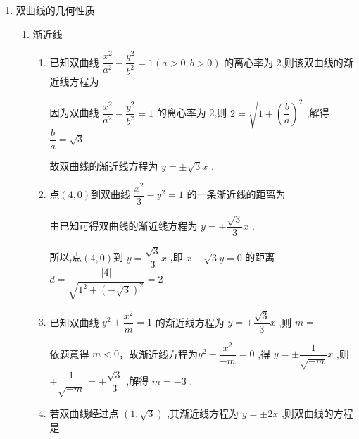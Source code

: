 \begin{enumerate}
\begin{enumerate}
\begin{jieda}
            由双曲线 $\dfrac{{x}^{2}}{{a}^{2}} - \dfrac{{y}^{2}}{{b}^{2}} = 1\left( {a > 0,b > 0}\right)$ 的离心率为 2,得 $e = \dfrac{c}{a} = 2$ ,又 ${c}^{2} = {a}^{2} + {b}^{2}$ ,
            
            解得 $a = 2,c = 4$ ,
            
            则双曲线的方程为 $\dfrac{{x}^{2}}{4} - \dfrac{{y}^{2}}{12} = 1$ .
        \end{jieda}
    \end{enumerate}
    \item 双曲线的几何性质
    \begin{enumerate}
        \item 渐近线
        \begin{enumerate}
            \item 已知双曲线 $\dfrac{{x}^{2}}{{a}^{2}} - \dfrac{{y}^{2}}{{b}^{2}} = 1\left( {a > 0,b > 0}\right)$ 的离心率为 2,则该双曲线的渐近线方程为
            \begin{jieda}
                因为双曲线 $\dfrac{{x}^{2}}{{a}^{2}} - \dfrac{{y}^{2}}{{b}^{2}} = 1$ 的离心率为 2,则 $2 = \sqrt{1 + {\left( \dfrac{b}{a}\right) }^{2}}$ ,解得 $\dfrac{b}{a} = \sqrt{3}$ 
                
                故双曲线的渐近线方程为 $y =  \pm  \sqrt{3}x$ .
            \end{jieda}
            \item 点$(4,0)$到双曲线 $\dfrac{{x}^{2}}{3} - {y}^{2} = 1$ 的一条渐近线的距离为
            \begin{jieda}
                由已知可得双曲线的渐近线方程为 $y =  \pm \dfrac{\sqrt{3}}{3}x$ .
                
                所以,点$(4,0)$到 $y = \dfrac{\sqrt{3}}{3}x$ ,即 $x - \sqrt{3}y = 0$ 的距离 $d = \dfrac{\left| 4\right| }{\sqrt{{1}^{2} + {\left( -\sqrt{3}\right) }^{2}}} = 2$ 
            \end{jieda}
            \item 已知双曲线 ${y}^{2} + \dfrac{{x}^{2}}{m} = 1$ 的渐近线方程为 $y =  \pm  \dfrac{\sqrt{3}}{3}x$ ,则 $m =$
            
            \begin{jieda}
                依题意得 $m < 0$，故渐近线方程为${y}^{2} - \dfrac{{x}^{2}}{-m} = 0$ ,得 $y =  \pm  \dfrac{1}{\sqrt{-m}}x$ ,则 $\pm  \dfrac{1}{\sqrt{-m}} =  \pm  \dfrac{\sqrt{3}}{3}$ ,解得 $m =  - 3$ .
            \end{jieda}
            \item 若双曲线经过点 $\left( {1,\sqrt{3}}\right)$ ,其渐近线方程为 $y =  \pm  {2x}$ ,则双曲线的方程是.
            

\end{enumerate}
\end{enumerate}
\end{enumerate}
